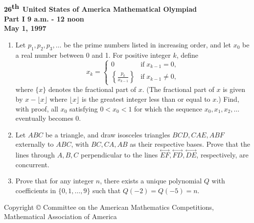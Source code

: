 \documentclass[12pt]{article}
\begin{document}
\setlength{\baselineskip}{.24in}
\begin{center}
${\bf 26}^{\mbox{\bf th}}$ {\bf United States of America
Mathematical Olympiad} \\[.1in]
{\bf Part I \hspace{.25in} 9 a.m. - 12 noon}\\[.05in]
{\bf May 1, 1997}
\end{center}
\begin{enumerate}

\vspace*{.2in}

\item %
Let $p_1, p_2, p_3, \ldots$ be the prime numbers listed in
increasing order, and let $x_0$ be a real number between 0
and 1.  For positive integer $k$, define
\[
x_k = 
\begin{cases}
0 & \mbox{if} \; x_{k-1} = 0, \\[.1in]
{\displaystyle \left\{ \frac{p_k}{x_{k-1}} \right\}} & 
\mbox{if} \; x_{k-1} \neq 0,
\end{cases}
\]
where $\{x\}$ denotes the fractional part of $x$.  (The fractional
part of $x$ is given by $x - \lfloor x \rfloor$ where $\lfloor
x \rfloor$ is the greatest integer less than or equal to $x$.)
Find, with proof, all $x_0$ satisfying $0 < x_0 < 1$ 
for which the sequence $x_0, x_1, x_2, \ldots $ eventually becomes
0.

\item %
Let $ABC$ be a triangle, and draw isosceles triangles
$BCD, CAE, ABF$ externally to $ABC$, with $BC, CA, AB$ as their
respective bases.  Prove that the lines through $A,B,C$
perpendicular to the lines $\stackrel{\longleftrightarrow}{EF}, 
\stackrel{\longleftrightarrow}{FD},
\stackrel{\longleftrightarrow}{DE}$, 
respectively, are concurrent.

\item %
Prove that for any integer $n$, there exists a unique polynomial
$Q$ with coefficients in $\{0,1,\ldots,9\}$ such that
$Q(-2) = Q(-5) = n$.

\end{enumerate}
\vspace*{\fill}
\begin{center}
{\footnotesize Copyright \copyright \hspace{.05in} Committee on
the American Mathematics Competitions, \\ 
Mathematical Association of America}
\end{center}
\end{document}
